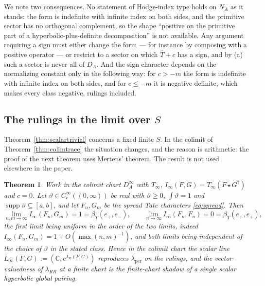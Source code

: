 \documentclass[11pt]{amsart}
\newtheorem{theorem}{Theorem}[section]
\theoremstyle{definition}
\theoremstyle{remark}
\newcommand{\C}{\mathbb C}
\newcommand{\supp}{\operatorname{supp}}
\newcommand{\Th}{\widehat{T}}
\newcommand{\DA}{D_A}
\begin{document}
We note two consequences.  No statement of Hodge-index type holds on $N_A$ as
it stands: the form is indefinite with infinite
index on both sides, and the primitive sector has no orthogonal complement, so
the shape ``positive on the primitive part of a hyperbolic-plus-definite
decomposition'' is not available.  Any argument requiring a sign must either
change the form --- for instance by composing with a positive operator --- or
restrict to a sector on which $\Th+c$ has a sign, and by (a) such a sector is
never all of $\DA$.  And the sign character depends on the normalizing constant
only in the following way: for $c>-m$ the form is indefinite with infinite index
on both sides, and for $c\le-m$ it is negative definite, which makes every
class negative, rulings included.

\subsection{The rulings in the limit over \texorpdfstring{$S$}{S}}

Theorem~\ref{thm:scalartrivial} concerns a fixed finite $S$.  In the colimit of
Theorem~\ref{thm:colimtrace} the situation changes, and the reason is
arithmetic: the proof of the next theorem uses Mertens' theorem.  The result is
not used elsewhere in the paper.

\begin{theorem}\label{thm:mertens}
Work in the colimit chart $\DA^{\infty}$ with $T_{\infty}$,
$I_{\infty}(F,G)=T_{\infty}(F\star G^{\dagger})$ and $c=0$.  Let $\vartheta\in
C_c^{\infty}((0,\infty))$ be real with $\vartheta\ge0$, $\int\vartheta=1$ and
$\supp\vartheta\subseteq[a,b]$, and let $F_n,G_m$ be the spread Tate characters
\eqref{eq:spread}.  Then
\begin{equation}\label{eq:mertenslimit}
\lim_{n,m\to\infty}I_{\infty}(F_n,G_m)=1=\beta_T(e_+,e_-),\qquad
\lim_{n\to\infty}I_{\infty}(F_n,F_n)=0=\beta_T(e_+,e_+),
\end{equation}
the first limit being uniform in the order of the two limits, indeed
$I_{\infty}(F_n,G_m)=1+O(\max(n,m)^{-1})$, and both limits being independent of
the choice of $\vartheta$ in the stated class.  Hence in the colimit chart the
scalar line $L_{\infty}(F,G):=(\C,e^{I_{\infty}(F,G)})$ reproduces
$\lambda_{\mathrm{per}}$ on the rulings, and the vector-valuedness of
$\lambda_{RR}$ at a finite chart is the finite-chart shadow of a single scalar
hyperbolic global pairing.
\end{theorem}
\end{document}
